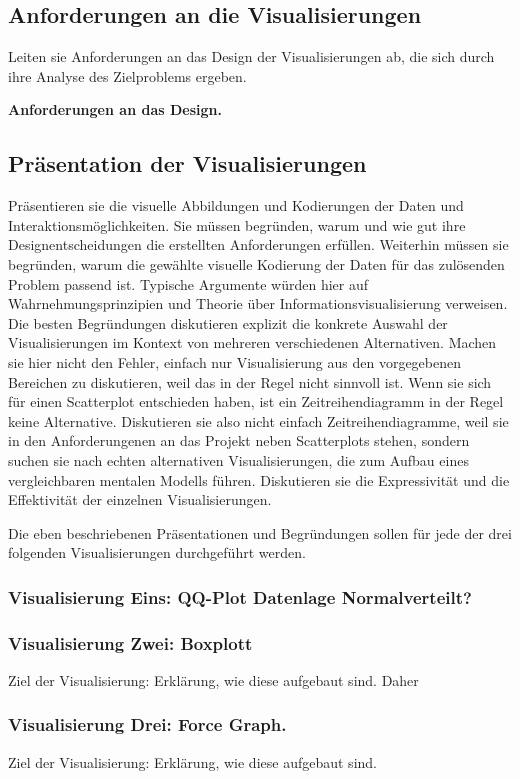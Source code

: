 \documentclass[usegeometry=true]{scrartcl}
\begin{document}
\subsection{Anforderungen an die Visualisierungen}
Leiten sie Anforderungen an das Design der Visualisierungen ab, die sich durch ihre Analyse des Zielproblems ergeben.

\textbf{ Anforderungen an das Design. }
\subsection{Präsentation der Visualisierungen}
Präsentieren sie die visuelle Abbildungen und Kodierungen der Daten und Interaktionsmöglichkeiten. 
Sie müssen  begründen, warum und wie gut ihre Designentscheidungen die erstellten Anforderungen erfüllen. 
Weiterhin müssen sie begründen, warum die gewählte visuelle Kodierung der Daten für das zulösenden Problem passend ist.
Typische Argumente würden hier auf Wahrnehmungsprinzipien und Theorie über Informationsvisualisierung verweisen. 
Die besten Begründungen diskutieren explizit die konkrete Auswahl der Visualisierungen im Kontext von mehreren verschiedenen Alternativen. 
Machen sie hier nicht den Fehler, einfach nur Visualisierung aus den vorgegebenen Bereichen zu diskutieren, weil das in der Regel nicht sinnvoll ist.
Wenn sie sich für einen Scatterplot entschieden haben, ist ein Zeitreihendiagramm in der Regel keine Alternative.
Diskutieren sie also nicht einfach Zeitreihendiagramme, weil sie in den Anforderungenen an das Projekt neben Scatterplots stehen, sondern suchen sie nach echten alternativen Visualisierungen, die zum Aufbau eines vergleichbaren mentalen Modells führen. 
Diskutieren sie die Expressivität und die Effektivität der einzelnen Visualisierungen. 

Die eben beschriebenen Präsentationen und Begründungen sollen für jede der drei folgenden Visualisierungen durchgeführt werden. 
\subsubsection{Visualisierung Eins: QQ-Plot Datenlage Normalverteilt?}

\subsubsection{Visualisierung Zwei: Boxplott}
Ziel der Visualisierung: 
Erklärung, wie diese aufgebaut sind. Daher 
\subsubsection{Visualisierung Drei: Force Graph.}
Ziel der Visualisierung: 
Erklärung, wie diese aufgebaut sind. 
\end{document}
